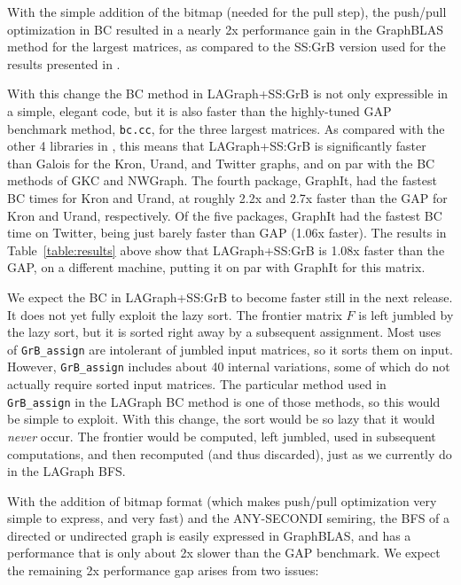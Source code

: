
With the simple addition of the bitmap (needed for the pull step), the
push/pull optimization in BC resulted in a nearly 2x performance gain in the
GraphBLAS method for the largest matrices, as compared to the SS:GrB version
used for the results presented in \cite{DBLP:conf/ppsc/ZhangAH20}.

With this change the BC method in LAGraph+SS:GrB is not only expressible in a
simple, elegant code, but it is also faster than the highly-tuned GAP benchmark
method, \verb'bc.cc', for the three largest matrices.  As compared with the
other 4 libraries in \cite{DBLP:conf/sc/BeamerAP12}, this means that
LAGraph+SS:GrB is significantly faster than Galois for the Kron, Urand, and
Twitter graphs, and on par with the BC methods of GKC and NWGraph.  The fourth
package, GraphIt, had the fastest BC times for Kron and Urand, at roughly 2.2x
and 2.7x faster than the GAP for Kron and Urand, respectively.  Of the five
packages, GraphIt had the fastest BC time on Twitter, being just barely faster
than GAP (1.06x faster).  The results in Table~\ref{table:results} above show
that LAGraph+SS:GrB is 1.08x faster than the GAP, on a different machine,
putting it on par with GraphIt for this matrix.

We expect the BC in LAGraph+SS:GrB to become faster still in the next
release.  It does not yet fully exploit the lazy sort.  The frontier matrix $F$
is left jumbled by the lazy sort, but it is sorted right away by a subsequent
assignment.  Most uses of \verb'GrB_assign' are intolerant of jumbled input
matrices, so it sorts them on input.  However, \verb'GrB_assign' includes
about 40 internal variations, some of which do not actually require sorted
input matrices.  The particular method used in \verb'GrB_assign' in the
LAGraph BC method is one of those methods, so this would be simple to exploit.
With this change, the sort would be so lazy that it would {\em never} occur.
The frontier would be computed, left jumbled, used in subsequent computations,
and then recomputed (and thus discarded), just as we currently do in the
LAGraph BFS.

With the addition of bitmap format (which makes push/pull optimization very
simple to express, and very fast) and the ANY-SECONDI semiring, the BFS of a
directed or undirected graph is easily expressed in GraphBLAS, and has a
performance that is only about 2x slower than the GAP benchmark.  We expect
the remaining 2x performance gap arises from two issues:

